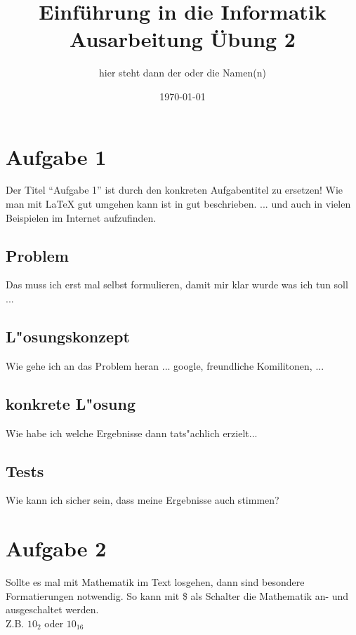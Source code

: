 \documentclass[a4paper,11pt,titlepage]{article}
\begin{document}
    \title{Einf\"uhrung in die Informatik\\
    Ausarbeitung \"Ubung 2}


    \author{hier steht dann der oder die Namen(n)}


    \date{\today}

    \maketitle{\thispagestyle{plain}}


    \section{Aufgabe 1}
    Der Titel "`Aufgabe 1"' ist durch den konkreten Aufgabentitel zu ersetzen!
    Wie man mit LaTeX gut umgehen kann ist in \cite{lkurz} gut beschrieben.
    ... und auch in vielen Beispielen im Internet aufzufinden.

    \subsection{Problem}
    Das muss ich erst mal selbst formulieren, damit mir klar wurde was ich tun soll ...

    \subsection{L"osungskonzept}
    Wie gehe ich an das Problem heran ... google, freundliche Komilitonen, ...

    \subsection{konkrete L"osung}
    Wie habe ich welche Ergebnisse dann tats"achlich erzielt...

    \subsection{Tests}
    Wie kann ich sicher sein, dass meine Ergebnisse auch stimmen?


    \section{Aufgabe 2}
    Sollte es mal mit Mathematik im Text losgehen, dann sind besondere
    Formatierungen notwendig. So kann mit \$ als Schalter die Mathematik
    an- und ausgeschaltet werden.\\
    Z.B. $10_2$ oder $10_{16}$
\end{document}
